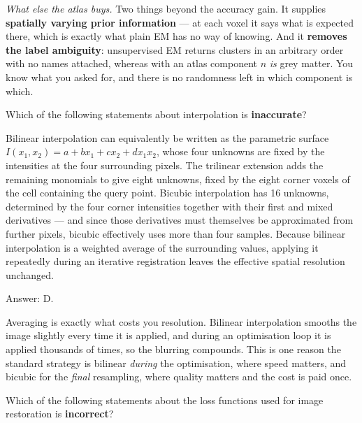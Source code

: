 \documentclass[11pt]{exam}
\newcommand{\answerspace}[1]{\ifprintanswers\else\vspace{#1}\fi}
\begin{document}
\begin{questions}
\begin{solution}
  \emph{What else the atlas buys.} Two things beyond the accuracy gain. It supplies
  \textbf{spatially varying prior information} --- at each voxel it says what is expected there,
  which is exactly what plain EM has no way of knowing. And it \textbf{removes the label
  ambiguity}: unsupervised EM returns clusters in an arbitrary order with no names attached, whereas
  with an atlas component $n$ \emph{is} grey matter. You know what you asked for, and there is no
  randomness left in which component is which.
\end{solution}
\answerspace{7.5cm}

\question
Which of the following statements about interpolation is \textbf{inaccurate}?

\begin{choices}
  \choice Bilinear interpolation can equivalently be written as the parametric surface
  $I(x_1,x_2) = a + b x_1 + c x_2 + d x_1 x_2$, whose four unknowns are fixed by the intensities at
  the four surrounding pixels.
  \choice The trilinear extension adds the remaining monomials to give eight unknowns, fixed by the
  eight corner voxels of the cell containing the query point.
  \choice Bicubic interpolation has 16 unknowns, determined by the four corner intensities together
  with their first and mixed derivatives --- and since those derivatives must themselves be
  approximated from further pixels, bicubic effectively uses more than four samples.
  \choice Because bilinear interpolation is a weighted average of the surrounding values, applying
  it repeatedly during an iterative registration leaves the effective spatial resolution unchanged.
\end{choices}

\begin{solution}
  Answer: D.

  Averaging is exactly what costs you resolution. Bilinear interpolation smooths the image slightly
  every time it is applied, and during an optimisation loop it is applied thousands of times, so the
  blurring compounds. This is one reason the standard strategy is bilinear \emph{during} the
  optimisation, where speed matters, and bicubic for the \emph{final} resampling, where quality
  matters and the cost is paid once.
\end{solution}

\question
Which of the following statements about the loss functions used for image restoration is
\textbf{incorrect}?


\end{questions}
\end{document}
